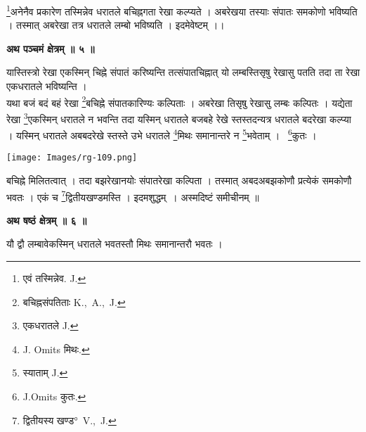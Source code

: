 \documentclass[11pt, openany]{book}
\begin{document}
 \renewcommand{\thefootnote}{२}\footnote{एवं तस्मिन्नेव. {\en J.}}अनेनैव प्रकारेण तस्मिन्नेव धरातले बचिह्नगता रेखा कल्प्यते । अबरेखया तस्याः संपातः समकोणो भविष्यति । तस्मात् अबरेखा तत्र धरातले लम्बो भविष्यति । इदमेवेष्टम्  ।।\\
 \begin{center}
\textbf{\large अथ पञ्चमं क्षेत्रम् ॥ ५ ॥}
\end{center}
\vspace{2mm}

{\ab यास्तिस्त्रो रेखा एकस्मिन् चिह्ने संपातं करिष्यन्ति तत्संपातचिह्नात् यो लम्बस्तिसृषु रेखासु पतति तदा ता रेखा एकधरातले भविष्यन्ति ।}\\

 यथा बजं बदं बहं रेखा \renewcommand{\thefootnote}{३}\footnote{बचिह्नसंपतिताः {\en K.,~A.,~J.}}बचिह्ने संपातकारिण्यः कल्पिताः ।
अबरेखा तिसृषु रेखासु लम्बः कल्पितः । यद्येता रेखा \renewcommand{\thefootnote}{४}\footnote{एकधरातले {\en J.}}एकस्मिन् धरातले न भवन्ति तदा यस्मिन् धरातले बजबहे रेखे स्तस्तदन्यत्र धरातले बदरेखा कल्प्या  । यस्मिन् धरातले अबबदरेखे स्तस्ते उभे धरातले \renewcommand{\thefootnote}{५}\footnote{{\en J. Omits} मिथः.}मिथः समानान्तरे न \renewcommand{\thefootnote}{६}\footnote{ स्याताम् {\en J.}}भवेताम् ।  \renewcommand{\thefootnote}{७}\footnote{{\en J.Omits} कुतः. }कुतः । 

\begin{center}
\texttt{[image: Images/rg-109.png]}
\end{center}
 बचिह्ने मिलितत्वात् । तदा बझरेखानयोः संपातरेखा कल्पिता । तस्मात् अबदअबझकोणौ प्रत्येकं समकोणौ भवतः । एकं च \renewcommand{\thefootnote}{८}\footnote{द्वितीयस्य खण्ड°~{\en V.,~J.}}द्वितीयखण्डमस्ति । इदमशुद्धम्~। अस्मदिष्टं समीचीनम् ॥\\
\begin{center}
\textbf{\large अथ षष्ठं क्षेत्रम् ॥ ६ ॥}
\end{center}
\vspace{2mm}

{\ab यौ द्वौ लम्बावेकस्मिन् धरातले भवतस्तौ मिथः समानान्तरौ भवतः ।}

\newpage
\end{document}
